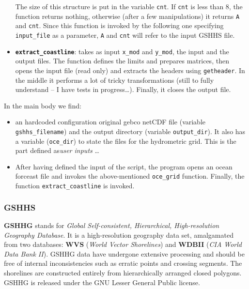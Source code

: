 \begin{itemize}
    The size of this structure is put in the variable \texttt{cnt}. If \texttt{cnt} is less than 8, the function returns nothing, otherwise (after a few manipulations) it returns \texttt{A} and \texttt{cnt}. Since this function is invoked by the following one specifying \texttt{input\_file} as a parameter, \texttt{A} and \texttt{cnt} will refer to the input GSHHS file. 
    
    \item \textbf{\texttt{extract\_coastline}}: takes as input \texttt{x\_mod} and \texttt{y\_mod}, the input and the output files.
    The function defines the limits and prepares matrices, then opens the input file (read only) and extracts the headers using \texttt{getheader}. 
    In the middle it performs a lot of tricky transformations (still to fully understand -- I have tests in progress\dots). Finally, it closes the output file.
        
\end{itemize}

In the main body we find:

\begin{itemize}
    \item an hardcoded configuration original gebco netCDF file (variable \texttt{gshhs\_filename}) and the output directory (variable \texttt{output\_dir}). It also has a variable (\texttt{oce\_dir}) to state the files for the hydrometric grid. This is the part defined as\textit{user inputs} \dots
    
    \item After having defined the input of the script, the program opens an ocean forceast file and invokes the above-mentioned \texttt{oce\_grid} function. Finally, the function \texttt{extract\_coastline} is invoked.    
\end{itemize}

\subsubsection{GSHHS}

\textbf{GSHHG} stands for \textit{Global Self-consistent, Hierarchical, High-resolution Geography Database}. It is a high-resolution geography data set, amalgamated from two databases:  \textbf{WVS} (\textit{World Vector Shorelines}) and \textbf{WDBII} (\textit{CIA World Data Bank II}). %
GSHHG data have undergone extensive processing and should be free of internal inconsistencies such as erratic points and crossing segments. The shorelines are constructed entirely from hierarchically arranged closed polygons. GSHHG is released under the GNU Lesser General Public license. 

